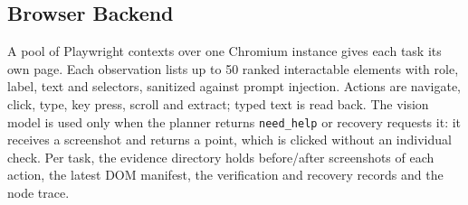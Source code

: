 

\subsection{Browser Backend}
\label{sec:browser}

A pool of Playwright contexts over one Chromium instance gives each task its own page. Each observation lists up to 50 ranked interactable elements with role, label, text and selectors, sanitized against prompt injection. Actions are navigate, click, type, key press, scroll and extract; typed text is read back. The vision model is used only when the planner returns \texttt{need\_help} or recovery requests it: it receives a screenshot and returns a point, which is clicked without an individual check. Per task, the evidence directory holds before/after screenshots of each action, the latest DOM manifest, the verification and recovery records and the node trace.
